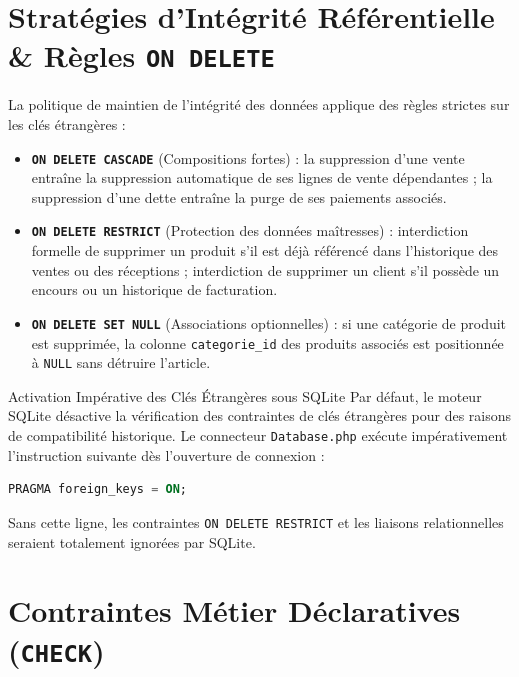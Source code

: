 \documentclass[11pt,a4paper,titlepage,twoside,openright]{report}
\begin{document}
\section{Stratégies d'Intégrité Référentielle \& Règles \texttt{ON DELETE}}

La politique de maintien de l'intégrité des données applique des règles strictes sur les clés étrangères :
\begin{itemize}
    \item \textbf{\texttt{ON DELETE CASCADE}} (Compositions fortes) : la suppression d'une vente entraîne la suppression automatique de ses lignes de vente dépendantes ; la suppression d'une dette entraîne la purge de ses paiements associés.
    \item \textbf{\texttt{ON DELETE RESTRICT}} (Protection des données maîtresses) : interdiction formelle de supprimer un produit s'il est déjà référencé dans l'historique des ventes ou des réceptions ; interdiction de supprimer un client s'il possède un encours ou un historique de facturation.
    \item \textbf{\texttt{ON DELETE SET NULL}} (Associations optionnelles) : si une catégorie de produit est supprimée, la colonne \texttt{categorie\_id} des produits associés est positionnée à \texttt{NULL} sans détruire l'article.
\end{itemize}

\begin{alertbox}{Activation Impérative des Clés Étrangères sous SQLite}
Par défaut, le moteur SQLite désactive la vérification des contraintes de clés étrangères pour des raisons de compatibilité historique. Le connecteur \texttt{Database.php} exécute impérativement l'instruction suivante dès l'ouverture de connexion :
\begin{lstlisting}[language=SQL]
PRAGMA foreign_keys = ON;
\end{lstlisting}
Sans cette ligne, les contraintes \texttt{ON DELETE RESTRICT} et les liaisons relationnelles seraient totalement ignorées par SQLite.
\end{alertbox}

\section{Contraintes Métier Déclaratives (\texttt{CHECK})}
\end{document}
